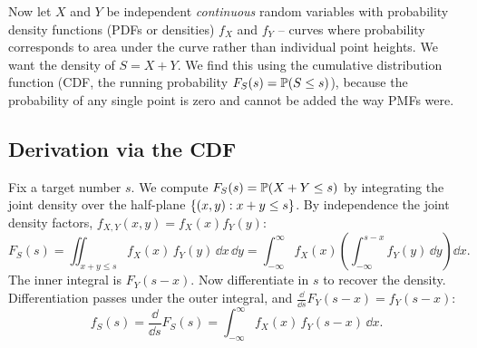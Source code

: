Now let $X$ and $Y$ be independent \emph{continuous} random variables with
probability density functions (PDFs or densities) $f_X$ and $f_Y$ --
curves where probability corresponds to area under the curve rather than
individual point heights. We want the density of $S = X+Y$. We find this
using the cumulative distribution function (CDF, the running probability
$F_S(s) = \P(S \le s)$), because the probability of any single point is zero
and cannot be added the way PMFs were.

\subsection{Derivation via the CDF}

Fix a target number $s$. We compute $F_S(s) = \P(X+Y \le s)$ by integrating
the joint density over the half-plane $\set{(x,y): x+y\le s}$. By
independence the joint density factors, $f_{X,Y}(x,y)=f_X(x)f_Y(y)$:
\[
F_S(s) = \iint_{x+y\le s} f_X(x)\,f_Y(y)\,\dd x\,\dd y
       = \int_{-\infty}^{\infty} f_X(x)
         \left( \int_{-\infty}^{s-x} f_Y(y)\,\dd y \right) \dd x.
\]
The inner integral is $F_Y(s-x)$. Now differentiate in $s$ to recover the
density. Differentiation passes under the outer integral, and
$\frac{\dd}{\dd s}F_Y(s-x)=f_Y(s-x)$:
\[
f_S(s) = \frac{\dd}{\dd s}F_S(s)
       = \int_{-\infty}^{\infty} f_X(x)\,f_Y(s-x)\,\dd x.
\]

